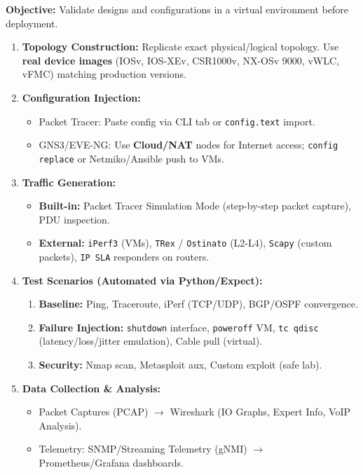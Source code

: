 \documentclass[11pt]{article}
\begin{document}
\begin{methode}
\textbf{Objective:} Validate designs and configurations in a virtual environment before deployment.
\begin{enumerate}
    \item \textbf{Topology Construction:} Replicate exact physical/logical topology. Use \textbf{real device images} (IOSv, IOS-XEv, CSR1000v, NX-OSv 9000, vWLC, vFMC) matching production versions.
    \item \textbf{Configuration Injection:} 
    \begin{itemize}
        \item Packet Tracer: Paste config via CLI tab or \texttt{config.text} import.
        \item GNS3/EVE-NG: Use \textbf{Cloud/NAT} nodes for Internet access; \texttt{config replace} or Netmiko/Ansible push to VMs.
    \end{itemize}
    \item \textbf{Traffic Generation:}
    \begin{itemize}
        \item \textbf{Built-in:} Packet Tracer Simulation Mode (step-by-step packet capture), PDU inspection.
        \item \textbf{External:} \texttt{iPerf3} (VMs), \texttt{TRex} / \texttt{Ostinato} (L2-L4), \texttt{Scapy} (custom packets), \texttt{IP SLA} responders on routers.
    \end{itemize}
    \item \textbf{Test Scenarios (Automated via Python/Expect):}
    \begin{enumerate}
        \item \textbf{Baseline:} Ping, Traceroute, iPerf (TCP/UDP), BGP/OSPF convergence.
        \item \textbf{Failure Injection:} \texttt{shutdown} interface, \texttt{poweroff} VM, \texttt{tc qdisc} (latency/loss/jitter emulation), Cable pull (virtual).
        \item \textbf{Security:} Nmap scan, Metasploit aux, Custom exploit (safe lab).
    \end{enumerate}
    \item \textbf{Data Collection \& Analysis:} 
    \begin{itemize}
        \item Packet Captures (PCAP) $\rightarrow$ Wireshark (IO Graphs, Expert Info, VoIP Analysis).
        \item Telemetry: SNMP/Streaming Telemetry (gNMI) $\rightarrow$ Prometheus/Grafana dashboards.

\end{itemize}
\end{enumerate}
\end{methode}
\end{document}
